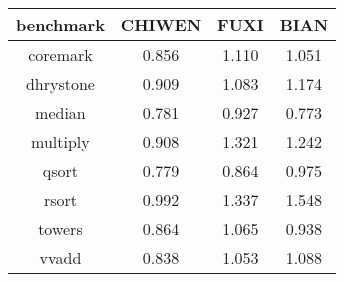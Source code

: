 \begin{table}[!htbp]
	\label{tab:ipc_result_ruo}
	\centering
	\footnotesize%
	\setlength{\tabcolsep}{4pt}%
	\renewcommand{\arraystretch}{1.2}%
	\begin{tabular}{cccc}
		\hline
		benchmark & CHIWEN & FUXI & BIAN \\%
		\hline
		coremark    & 0.856 & 1.110 & 1.051 \\
		dhrystone   & 0.909 & 1.083 & 1.174 \\
		median 		& 0.781 & 0.927 & 0.773 \\
		multiply 	& 0.908 & 1.321 & 1.242 \\
		qsort  		& 0.779 & 0.864 & 0.975 \\
		rsort  		& 0.992 & 1.337 & 1.548 \\
		towers 		& 0.864 & 1.065 & 0.938 \\
		vvadd 		& 0.838 & 1.053 & 1.088 \\
		\hline
	\end{tabular}
\end{table}

